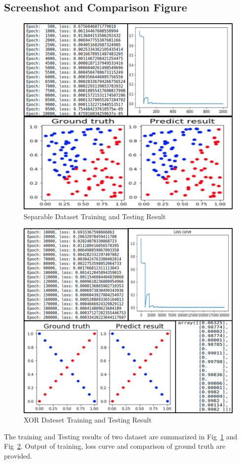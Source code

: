 \documentclass[12pt,a4paper]{article}
\begin{document}
\subsection{Screenshot and Comparison Figure}
\begin{figure}[t]
  \centering
  \includegraphics[scale=0.26]{separable_all.png}
  \caption{Separable Dataset Training and Testing Result}
  \label{fig:ls_res}
\end{figure}
\begin{figure}[t]
  \centering
  \includegraphics[scale=0.26]{xor_all.png}
  \caption{XOR Dateset Training and Testing Result}
  \label{fig:xor_res}
\end{figure}
The training and Testing results of two dataset are summarized in Fig~\ref{fig:ls_res} and Fig~\ref{fig:xor_res}. Output of training, loss curve and comparison of ground truth are provided. 
\end{document}
